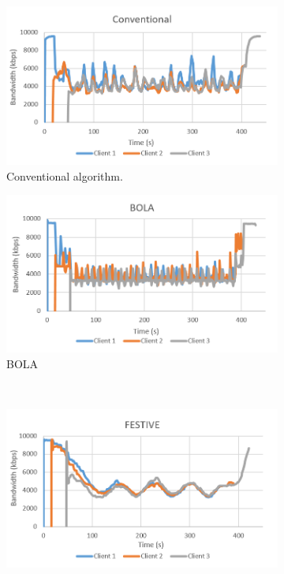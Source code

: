 \documentclass[journal]{IEEEtran}
\begin{document}
\begin{figure}[!h]
	\centering
	
    \begin{subfigure}[t]{0.3\textwidth}
         \centering
         \includegraphics[width=\textwidth]{images/Conventional.png}
         \caption{Conventional algorithm.}
         \label{Bw Conv}
     \end{subfigure}
     \begin{subfigure}[t]{0.3\textwidth}
         \centering
         \includegraphics[width=\textwidth]{images/Bw_BOLA.PNG}
         \caption{BOLA}
         \label{Bw BOLA}
     \end{subfigure}
     \\
	\begin{subfigure}[t]{0.3\textwidth}
         \centering
         \includegraphics[width=\textwidth]{images/FESTIVE.png}

\end{subfigure}
\end{figure}
\end{document}
